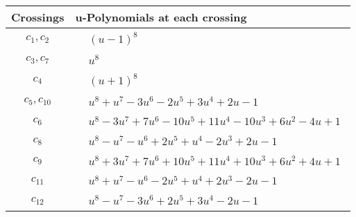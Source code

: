 \documentclass[1p]{elsarticle_modified}
\theoremstyle{definition}
\begin{document}
\begin{tabular}{m{50pt}|m{274pt}}
Crossings & \hspace{64pt}u-Polynomials at each crossing \\
\hline $$\begin{aligned}c_{1},c_{2}\end{aligned}$$&$\begin{aligned}
&(u-1)^8
\end{aligned}$\\
\hline $$\begin{aligned}c_{3},c_{7}\end{aligned}$$&$\begin{aligned}
&u^8
\end{aligned}$\\
\hline $$\begin{aligned}c_{4}\end{aligned}$$&$\begin{aligned}
&(u+1)^8
\end{aligned}$\\
\hline $$\begin{aligned}c_{5},c_{10}\end{aligned}$$&$\begin{aligned}
&u^8+u^7-3 u^6-2 u^5+3 u^4+2 u-1
\end{aligned}$\\
\hline $$\begin{aligned}c_{6}\end{aligned}$$&$\begin{aligned}
&u^8-3 u^7+7 u^6-10 u^5+11 u^4-10 u^3+6 u^2-4 u+1
\end{aligned}$\\
\hline $$\begin{aligned}c_{8}\end{aligned}$$&$\begin{aligned}
&u^8- u^7- u^6+2 u^5+u^4-2 u^3+2 u-1
\end{aligned}$\\
\hline $$\begin{aligned}c_{9}\end{aligned}$$&$\begin{aligned}
&u^8+3 u^7+7 u^6+10 u^5+11 u^4+10 u^3+6 u^2+4 u+1
\end{aligned}$\\
\hline $$\begin{aligned}c_{11}\end{aligned}$$&$\begin{aligned}
&u^8+u^7- u^6-2 u^5+u^4+2 u^3-2 u-1
\end{aligned}$\\
\hline $$\begin{aligned}c_{12}\end{aligned}$$&$\begin{aligned}
&u^8- u^7-3 u^6+2 u^5+3 u^4-2 u-1
\end{aligned}$\\
\hline
\end{tabular}\\~\\
\end{document}

